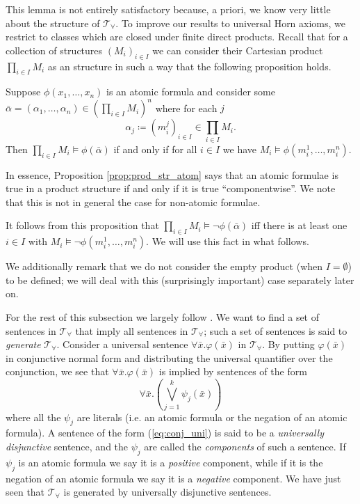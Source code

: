 This lemma is not entirely satisfactory because, a priori, we know very little about the structure of $\mathcal{T}_{\forall}$. To improve our results to universal Horn axioms, we restrict to classes which are closed under finite direct products. Recall that for a collection of structures $(M_i)_{i\in I}$ we can consider their Cartesian product $\prod_{i\in I} M_i$ as an structure in such a way that the following proposition holds.
\begin{prop}\label{prop:prod_str_atom}
	Suppose $\phi(x_1,\ldots,x_n)$ is an atomic formula and consider some  $\bar{\alpha} = (\alpha_1,\ldots,\alpha_n)\in \left(\prod_{i\in I} M_i\right)^n$ where for each $j$
	\[
	\alpha_j \coloneqq \left(m^j_i\right)_{i\in I} \in \prod_{i\in I} M_i.
	\]
	Then $\prod_{i\in I} M_i \models \phi(\bar{\alpha})$ if and only if for all $i\in I$ we have $M_i \models \phi(m_i^1, \ldots,m_i^n)$.
\end{prop}
\begin{rem}
	In essence, Proposition \ref{prop:prod_str_atom} says that an atomic formulae is true in a product structure if and only if it is true ``componentwise''. We note that this is not in general the case for non-atomic formulae.
	
	It follows from this proposition that $\prod_{i\in I} M_i \models \neg\phi(\bar{\alpha})$ iff  there is at least one $i\in I$ with $M_i \models \neg\phi(m_i^1, \ldots,m_i^n)$. We will use this fact in what follows.
	
	We additionally remark that we do not consider the empty product (when $I=\emptyset$) to be defined; we will deal with this (surprisingly important) case separately later on.
\end{rem}
For the rest of this subsection we largely follow \cite{cohn1981universal}. We want to find a set of sentences in $\mathcal{T}_{\forall}$ that imply all sentences in $\mathcal{T}_{\forall}$; such a set of sentences is said to \emph{generate} $\mathcal{T}_{\forall}$. Consider a universal sentence $\forall \bar{x}. \varphi(\bar{x})$ in $\mathcal{T}_{\forall}$. By putting $\varphi(\bar{x})$ in conjunctive normal form and distributing the universal quantifier over the conjunction, we see that $\forall \bar{x}. \varphi(\bar{x})$ is implied by sentences of the form
\begin{equation}\label{eq:conj_uni}
	\forall \bar{x}. \left(\bigvee_{j=1}^k \psi_j(\bar{x})\right) 
\end{equation}
where all the $\psi_j$ are literals (i.e. an atomic formula or the negation of an atomic formula). A sentence of the form (\ref{eq:conj_uni}) is said to be a \emph{universally disjunctive} sentence, and the $\psi_j$ are called the \emph{components} of such a sentence. If $\psi_j$ is an atomic formula we say it is a \emph{positive} component, while if it is the negation of an atomic formula we say it is a \emph{negative} component. We have just seen that $\mathcal{T}_{\forall}$ is generated by universally disjunctive sentences.

